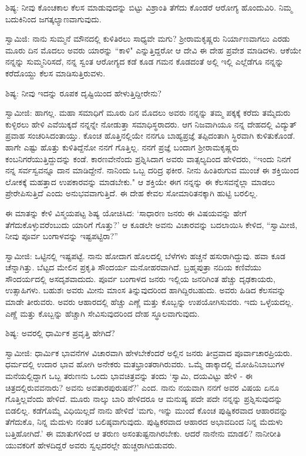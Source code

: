 ಶಿಷ್ಯ: ನೀವು ಕೊಂಚಕಾಲ ಕೆಲಸ ಮಾಡುವುದನ್ನು ಬಿಟ್ಟು ವಿಶ್ರಾಂತಿ ತೆಗೆದು ಕೊಂಡರೆ ಆರೋಗ್ಯ ಹೊಂದುವಿರಿ. ನಿಮ್ಮ ಬದುಕಿನಿಂದ ಜಗತ್ಕಲ್ಯಾಣವಾಗುವುದು.

ಸ್ವಾಮಿಜಿ: ನಾನು ಸುಮ್ಮನೆ ಮೌನದಲ್ಲಿ ಕುಳಿತಿರಲು ಸಾಧ್ಯವೇ ಮಗು? ಶ‍್ರೀರಾಮಕೃಷ್ಣರು ನಿರ್ಯಾಣವಾಗಲು ಎರಡು ಮೂರು ದಿನ ಮೊದಲು ಅವರು ಯಾರನ್ನು “ಕಾಳಿ" ಎನ್ನುತ್ತಿದ್ದರೋ ಆ ದೇವಿ ಈ ದೇಹ ಪ್ರವೇಶ ಮಾಡಿದಳು. ಆಕೆಯೇ ನನ್ನನ್ನು ಸುಮ್ಮನಿರಿಸದೆ, ನನ್ನ ಸ್ವಂತ ಆರೋಗ್ಯದ ಕಡೆ ಕೂಡ ಗಮನ ಕೊಡದಂತೆ ಅಲ್ಲಿ ಇಲ್ಲಿ ಎಲ್ಲೆಡೆಗೂ ನನ್ನನ್ನು ಕರೆದೊಯ್ದು ಕೆಲಸ ಮಾಡಿಸುತ್ತಿರುವಳು.

ಶಿಷ್ಯ: ನೀವು ಇದನ್ನು ರೂಪಕ ದೃಷ್ಟಿಯಿಂದ ಹೇಳುತ್ತಿದ್ದೀರೇನು?

ಸ್ವಾಮೀಜಿ: ಹಾಗಲ್ಲ. ಮಹಾ ಸಮಾಧಿಗೆ ಮೂರು ದಿನ ಮೊದಲು ಅವರು ನನ್ನನ್ನು ತಮ್ಮ ಪಕ್ಕಕ್ಕೆ ಕರೆದು ತಮ್ಮೆದುರು ಕುಳ್ಳಿರಲು ಹೇಳಿ ಎವೆಯಿಕ್ಕದೆ ನನ್ನನ್ನೇ ನೋಡುತ್ತಾ ಸಮಾಧಿಸ್ಥರಾದರು. ಆಗ ನಿಜವಾಗಿಯೂ ನನ್ನ ದೇಹದಲ್ಲಿ ವಿದ್ಯುತ್ ಪ್ರವಾಹ ಸಂಚರಿಸಿದಂತಾಯ್ತು. ಕೊಂಚ ಹೊತ್ತಿನಲ್ಲಿಯೇ ನನಗೂ ಬಾಹ್ಯಪ್ರಜ್ಞೆ ತಪ್ಪಿದಂತಾಗಿ ಸ್ಥಿರವಾಗಿ ಕುಳಿತುಕೊಂಡೆ. ಹಾಗೇ ಎಷ್ಟು ಹೊತ್ತು ಕುಳಿತಿದ್ದೆನೋ ನನಗೆ ಗೊತ್ತಿಲ್ಲ. ನನಗೆ ಪ್ರಜ್ಞೆ ಬಂದಾಗ ಶ‍್ರೀರಾಮಕೃಷ್ಣರು ಕಂಬನಿಗರೆಯುತ್ತಿದ್ದುದನ್ನು ಕಂಡೆ. ಕಾರಣವೇನೆಂದು ಪ್ರಶ್ನಿಸಿದಾಗ ಅವರು ವಾತ್ಸಲ್ಯದಿಂದ ಹೇಳಿದರು, “ಇಂದು ನಿನಗೆ ನನ್ನ ಸರ್ವಸ್ವವನ್ನೂ ದಾನ ಮಾಡಿದ್ದೇನೆ. ನಾನಿಂದು ಒಬ್ಬ ದರಿದ್ರ ಫಕೀರ. ನೀನು ಹಿಂತಿರುಗುವ ಮುಂಚೆ ಈ ಶಕ್ತಿಯಿಂದ ಲೋಕಕ್ಕೆ ಮಹತ್ತಾದ ಉಪಕಾರವನ್ನು ಮಾಡಬೇಕು." ಆ ಶಕ್ತಿಯೇ ಈಗ ನನ್ನನ್ನು ಈ ಕೆಲಸವನ್ನೆಲ್ಲಾ ಮಾಡಲು ಪ್ರೇರೇಪಿಸುತ್ತಿದೆ ಎಂದು ಅನುಭವವಾಗುತ್ತಿದೆ. ಈ ದೇಹ ಕೇವಲ ಸೋಮಾರಿತನಕ್ಕಾಗಿ ಹುಟ್ಟಿ ಬರಲಿಲ್ಲ.

ಈ ಮಾತನ್ನು ಕೇಳಿ ವಿಸ್ಮಯಪಟ್ಟ ಶಿಷ್ಯ ಯೋಚಿಸಿದ: ‘ಸಾಧಾರಣ ಜನರು ಈ ವಿಷಯವನ್ನು ಹೇಗೆ ತೆಗೆದುಕೊಳ್ಳುವರೆಂಬುದು ಯಾರಿಗೆ ಗೊತ್ತು?’ ಆ ಕೂಡಲೇ ಅವನು ವಿಚಾರವನ್ನು ಬದಲಾಯಿಸಿ ಕೇಳಿದ, “ಸ್ವಾಮೀಜಿ, ನೀವು ಪೂರ್ವ ಬಂಗಾಳವನ್ನು ಇಷ್ಟಪಟ್ಟಿರಾ?”

ಸ್ವಾಮೀಜಿ: ಒಟ್ಟಿನಲ್ಲಿ ಇಷ್ಟಪಟ್ಟೆ. ನಾನು ಹೋದಾಗ ಹೊಲದಲ್ಲಿ ಬೆಳೆಗಳು ಹಚ್ಚನೆ ಹಸುರಾಗಿದ್ದುವು. ಹವಾ ಕೂಡ ಚೆನ್ನಾಗಿತ್ತು. ಬೆಟ್ಟದ ಮೇಲಿನ ಪ್ರಕೃತಿ ಸೌಂದರ್ಯ ಮನೋಹರವಾಗಿದೆ. ಬ್ರಹ್ಮಪುತ್ರಾ ನದಿಯ ಕಣಿವೆಯು ಸೌಂದರ್ಯದಲ್ಲಿ ಅಸದೃಶವಾದುದು. ಪೂರ್ವ ಬಂಗಾಳದ ಜನರು ಇಲ್ಲಿಯ ಜನರಿಗಿಂತ ಹೆಚ್ಚು ದೃಢಕಾಯರು, ಉತ್ಸಾಹಿಗಳು. ಬಹುಶಃ ಅವರು ಮೀನು ಮಾಂಸ ತಿನ್ನುವುದರಿಂದ ಹಾಗಿದ್ದಿರಬಹುದು. ಅವರು ಹಿಡಿದ ಕೆಲಸವನ್ನು ಮಾಡೇ ತೀರುವರು. ಅವರು ಆಹಾರದಲ್ಲಿ ಹೆಚ್ಚು ಎಣ್ಣೆ ಮತ್ತು ಕೊಬ್ಬನ್ನು ಉಪಯೋಗಿಸುವರು. ಇದು ಒಳ್ಳೆಯದಲ್ಲ. ಎಣ್ಣೆ ಮತ್ತು ಕೊಬ್ಬನ್ನು ಹೆಚ್ಚಾಗಿ ಸೇವಿಸುವುದರಿಂದ ದೇಹ ಸ್ಥೂಲವಾಗುವುದು.

ಶಿಷ್ಯ: ಅವರಲ್ಲಿ ಧಾರ್ಮಿಕ ಪ್ರವೃತ್ತಿ ಹೇಗಿದೆ?

ಸ್ವಾಮೀಜಿ: ಧಾರ್ಮಿಕ ಭಾವನೆಗಳ ವಿಚಾರವಾಗಿ ಹೇಳಬೇಕೆಂದರೆ ಅಲ್ಲಿನ ಜನರು ತೀವ್ರವಾದ ಪೂರ್ವಾಚಾರಪ್ರಿಯರು. ಧರ್ಮದಲ್ಲಿ ಉದಾರ ಭಾವ ಹೋಗಿ ಅನೇಕರು ಮತಭ್ರಾಂತರಾಗಿರುವರು. ಒಮ್ಮೆ ಡಾಕ್ಕಾದಲ್ಲಿ ಮೋಹಿನಿಬಾಬುಗಳ ಮನೆಯಲ್ಲಿದ್ದಾಗ ಒಬ್ಬ ತರುಣನು ಒಂದು ಭಾವಚಿತ್ರವನ್ನು ತಂದು ‘ಸ್ವಾಮಿ, ದಯವಿಟ್ಟು ಹೇಳಿ - ಈ ಚಿತ್ರದಲ್ಲಿರುವವನಾರು? ಅವನು ಅವತಾರಪುರುಷನೆ?’ ಎಂದ. ನಾನು ನಯವಾಗಿ ನನಗೆ ಅವರ ವಿಷಯ ಏನೂ ಗೊತ್ತಿಲ್ಲವೆಂದು ಹೇಳಿದೆ. ಮೂರು ನಾಲ್ಕು ಬಾರಿ ಹೇಳಿದರೂ ಆ ಮನುಷ್ಯ ಪದೇ ಪದೇ ನನ್ನನ್ನು ಪ್ರಶ್ನಿಸುವುದನ್ನು ಬಿಡಲಿಲ್ಲ. ಕಡೆಗೊಮ್ಮೆ ವಿಧಿಯಿಲ್ಲದೆ ನಾನು ಹೇಳಿದೆ ‘ಮಗು, ಇನ್ನು ಮುಂದೆ ಕೊಂಚ ಪುಷ್ಟಿಕರವಾದ ಆಹಾರವನ್ನು ತೆಗೆದುಕೊ, ನಿನ್ನ ಮೆದುಳು ನಂತರ ಬಲಿಷ್ಠವಾಗುವುದು. ಪುಷ್ಟಿಕರವಾದ ಆಹಾರದ ಅಭಾವದಿಂದ ನಿನ್ನ ಮೆದುಳು ಬತ್ತಿಹೋಗಿದೆ.’ ಈ ಮಾತುಗಳಿಂದ ಆ ತರುಣ ಅಸಂತುಷ್ಟನಾಗಿರಬೇಕು. ಆದರೆ ನಾನೇನು ಮಾಡಲಿ? ನಾನೀರೀತಿ ಯುವಕರಿಗೆ ಹೇಳದಿದ್ದರೆ ಅವರು ಸ್ವಲ್ಪದರಲ್ಲೇ ಹುಚ್ಚರಾಗಿಬಿಡುವರು.

